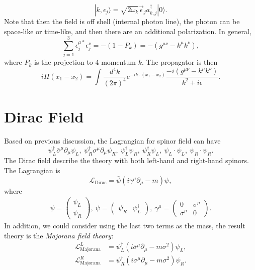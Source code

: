 \begin{equation}
	|k,\epsilon_j\rangle = \sqrt{2\omega_k}	\vec\epsilon_j a^\dagger_{k,j}|0\rangle.
\end{equation}
Note that then the field is off shell (internal photon line), the photon can be space-like or time-like, and then there are an additional polarization.
In general, 
\begin{equation*}
	\sum_{j=1}^3 \epsilon^{\mu*}_j \epsilon^\nu_j = -(1 - P_{k}) = -(g^{\mu\nu}-k^\mu k^\nu),
\end{equation*}
where $P_k$ is the projection to 4-momentum $k$.
The propagator is then
\begin{equation}
	i\Pi(x_1-x_2)= \int \frac{d^4 k}{(2\pi)^4} e^{-ik\cdot(x_1-x_2)}\frac{-i(g^{\mu\nu}-k^\mu k^\nu)}{k^2+i\epsilon}.
\end{equation}



\section{Dirac Field}

Based on previous discussion, the Lagrangian for spinor field can have
\begin{equation*}
	\psi_L^\dagger \bar\sigma^\mu \partial_\mu \psi_L,\ 
	\psi_R^\dagger \sigma^\mu \partial_\mu \psi_R,\ 
	\psi_L^\dagger \psi_R,\ \psi_R^\dagger \psi_L,\ 
	\psi_L \cdot \psi_L,\ \psi_R \cdot \psi_R.
\end{equation*}
The Dirac field describe the theory with both left-hand and right-hand spinors.
The Lagrangian is
\begin{equation}
	\mathcal{L}_{\mathrm{Dirac}}
	= \bar\psi \left(i\gamma^\mu \partial_\mu - m\right)\psi,
\end{equation}
where
\begin{eqnarray}
	\psi = \left(\begin{array}{c}
		\psi_L \\ \psi_R
	\end{array}\right),\ 
	\bar\psi = \left(\begin{array}{cc}
		\psi_R^\dagger & \psi_L^\dagger
	\end{array}\right),\ 
	\gamma^\mu = \left(\begin{array}{cc}
		0 & \sigma^\mu \\
		\bar\sigma^\mu & 0
	\end{array}\right).
\end{eqnarray}
In addition, we could consider using the last two terms as the mass, the result theory is the \textit{Majorana field theory}:
\begin{equation}
\begin{aligned}
	\mathcal{L}^{L}_{\mathrm{Majorana}}
	&= \psi_L^\dagger \left(i\bar\sigma^\mu \partial_\mu -m \sigma^2 \right) \psi_L, \\
	\mathcal{L}^{R}_{\mathrm{Majorana}}
	&= \psi_R^\dagger \left(i\sigma^\mu \partial_\mu -m \sigma^2 \right) \psi_R. 
\end{aligned}
\end{equation} 



